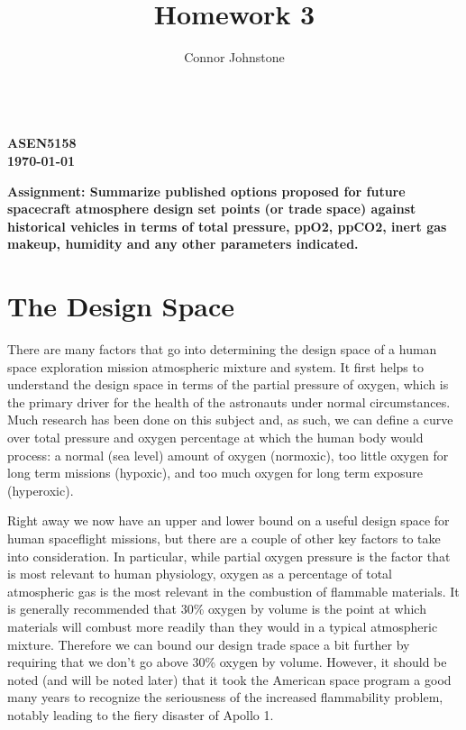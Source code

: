 \documentclass{article}
\renewcommand{\maketitle}{\hspace{-22px}  \textbf{{\theauthor} \\
ASEN5158 \\
\today \\
{\thetitle}} \titlerule}
\begin{document}
  \title{Homework 3}
  \author{Connor Johnstone}

  \maketitle

  \vspace{20px}
  \textbf{Assignment:
    Summarize published options proposed for future spacecraft atmosphere design set points (or trade space) against historical vehicles in terms of total pressure, ppO2, ppCO2, inert gas makeup, humidity and any other parameters indicated.
  }


  \section{The Design Space}

  There are many factors that go into determining the design space of a human space exploration mission atmospheric mixture and system. It first helps to understand the design space in terms of the partial pressure of oxygen, which is the primary driver for the health of the astronauts under normal circumstances. Much research has been done on this subject and, as such, we can define a curve over total pressure and oxygen percentage at which the human body would process: a normal (sea level) amount of oxygen (normoxic), too little oxygen for long term missions (hypoxic), and too much oxygen for long term exposure (hyperoxic). 

  Right away we now have an upper and lower bound on a useful design space for human spaceflight missions, but there are a couple of other key factors to take into consideration. In particular, while partial oxygen pressure is the factor that is most relevant to human physiology, oxygen as a percentage of total atmospheric gas is the most relevant in the combustion of flammable materials. It is generally recommended that 30\% oxygen by volume is the point at which materials will combust more readily than they would in a typical atmospheric mixture. Therefore we can bound our design trade space a bit further by requiring that we don't go above 30\% oxygen by volume. However, it should be noted (and will be noted later) that it took the American space program a good many years to recognize the seriousness of the increased flammability problem, notably leading to the fiery disaster of Apollo 1.
\end{document}
